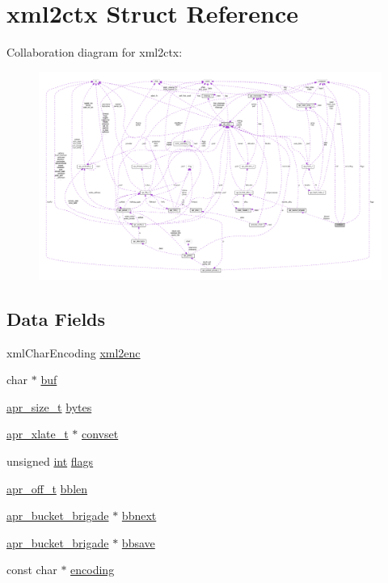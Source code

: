 \hypertarget{structxml2ctx}{}\section{xml2ctx Struct Reference}
\label{structxml2ctx}


Collaboration diagram for xml2ctx\+:
\nopagebreak
\begin{figure}[H]
\begin{center}
\leavevmode
\includegraphics[width=350pt]{structxml2ctx__coll__graph}
\end{center}
\end{figure}
\subsection*{Data Fields}
\begin{DoxyCompactItemize}
\item 
xml\+Char\+Encoding \hyperlink{structxml2ctx_abcf01fbd3a479f5e18c70e13b94a872e}{xml2enc}
\item 
char $\ast$ \hyperlink{structxml2ctx_a2c4d53ee19f9a3182f326ee94996571c}{buf}
\item 
\hyperlink{group__apr__platform_gaaa72b2253f6f3032cefea5712a27540e}{apr\+\_\+size\+\_\+t} \hyperlink{structxml2ctx_a8e99f7405110138a015cbe7dc3da583b}{bytes}
\item 
\hyperlink{group__APR__XLATE_ga069dabbadc30e3a4157c38104a250e77}{apr\+\_\+xlate\+\_\+t} $\ast$ \hyperlink{structxml2ctx_a017eb9c7d51ddeb8c227a3d714b5a3ed}{convset}
\item 
unsigned \hyperlink{pcre_8txt_a42dfa4ff673c82d8efe7144098fbc198}{int} \hyperlink{structxml2ctx_a4aee81c3c62abd8f282f8d7e2ed9d22b}{flags}
\item 
\hyperlink{group__apr__platform_ga6938af9075cec15c88299109381aa984}{apr\+\_\+off\+\_\+t} \hyperlink{structxml2ctx_a138932c4cc63789b8dab94eec16fef76}{bblen}
\item 
\hyperlink{structapr__bucket__brigade}{apr\+\_\+bucket\+\_\+brigade} $\ast$ \hyperlink{structxml2ctx_a33d04b0317851a0cc9fff325ce598cc4}{bbnext}
\item 
\hyperlink{structapr__bucket__brigade}{apr\+\_\+bucket\+\_\+brigade} $\ast$ \hyperlink{structxml2ctx_acc61aed278105ef49882b64f1f8509a6}{bbsave}
\item 
const char $\ast$ \hyperlink{structxml2ctx_a5c9fbf6db02d5eee8767f39bff29c714}{encoding}
\end{DoxyCompactItemize}


